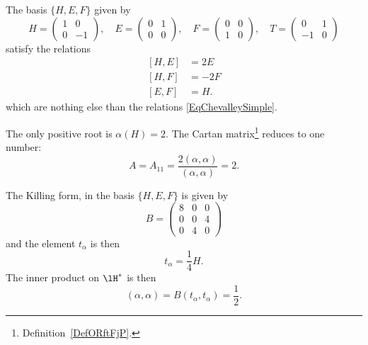 \begin{example}
    The basis \( \{ H,E,F \}\) given by
    \begin{equation}
    H=\begin{pmatrix}
    1 & 0 \\
    0 & -1
    \end{pmatrix}
    ,\quad
      E=\begin{pmatrix}
    0 & 1 \\
    0 & 0
    \end{pmatrix}
    ,\quad
     F=\begin{pmatrix}
    0 & 0 \\
    1 & 0
    \end{pmatrix},
    \quad
    T=\begin{pmatrix}
    0&1\\
    -1&0
    \end{pmatrix}
    \end{equation}
    satisfy the relations
    \begin{subequations}    \label{subEqsSBhuAWx}
        \begin{align}
            [H,E]&=2E\\
            [H,F]&=-2F\\
            [E,F]&=H.
        \end{align}
    \end{subequations}
    which are nothing else than the relations \eqref{EqChevalleySimple}.

    The only positive root is \( \alpha(H)=2\). The Cartan matrix\footnote{Definition~\ref{DefORftFjP}.} reduces to one number:
    \begin{equation}
        A=A_{11}=\frac{ 2(\alpha,\alpha) }{ (\alpha,\alpha) }=2.
    \end{equation}

    The Killing form, in the basis \( \{ H,E,F \}\) is given by
    \begin{equation}
        B=\begin{pmatrix}
            8    &   0    &   0    \\
            0    &   0    &   4    \\
            0    &   4    &   0
        \end{pmatrix}
    \end{equation}
    and the element \( t_{\alpha}\) is then
    \begin{equation}
        t_{\alpha}=\frac{1}{ 4 }H.
    \end{equation}
    The inner product on \( \lH^*\) is then
    \begin{equation}        \label{Eqinnerhstarsldc}
        (\alpha,\alpha)=B(t_{\alpha},t_{\alpha})=\frac{ 1 }{2}.
    \end{equation}
\end{example}

